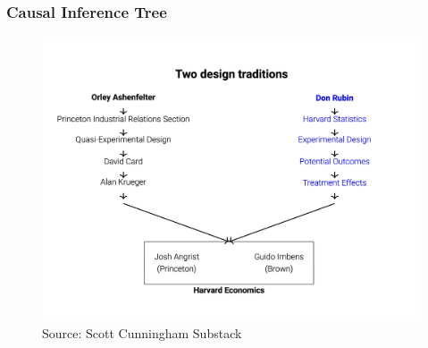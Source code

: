 \documentclass[xcolor=svgnames,t]{beamer}
\begin{document}
\begin{frame}
    \frametitle{Causal Inference Tree}
    \begin{figure}
        \includegraphics[width=0.8\linewidth]{Figures/CI_tree.jpg}
        \caption{Source: Scott Cunningham Substack}
    \end{figure}
\end{frame}
\end{document}
